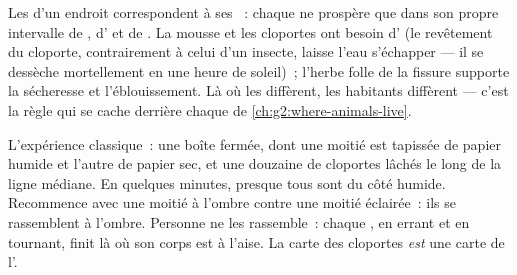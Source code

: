 \begin{proposition}\label{prop:g6:exploring-our-environment:decide}
Les  d'un endroit correspondent à ses ~:
chaque  ne prospère que dans son propre intervalle de
, d' et de . La mousse et les cloportes
ont besoin d' (le revêtement du cloporte, contrairement à
celui d'un insecte, laisse l'eau s'échapper --- il se dessèche
mortellement en une heure de soleil)~; l'herbe folle de la fissure
supporte la sécheresse et l'éblouissement. Là où les 
diffèrent, les habitants diffèrent --- c'est la règle qui se cache
derrière chaque  de \cref{ch:g2:where-animals-live}.
\end{proposition}
\admitted

\begin{example}\label{ex:g6:exploring-our-environment:chooser}
L'expérience classique~: une boîte fermée, dont une moitié est
tapissée de papier humide et l'autre de papier sec, et une douzaine
de cloportes lâchés le long de la ligne médiane. En quelques
minutes, presque tous sont du côté humide. Recommence avec une
moitié à l'ombre contre une moitié éclairée~: ils se rassemblent à
l'ombre. Personne ne les rassemble~: chaque , en errant et en
tournant, finit là où son corps est à l'aise. La carte des cloportes
\emph{est} une carte de l'.
\end{example}

